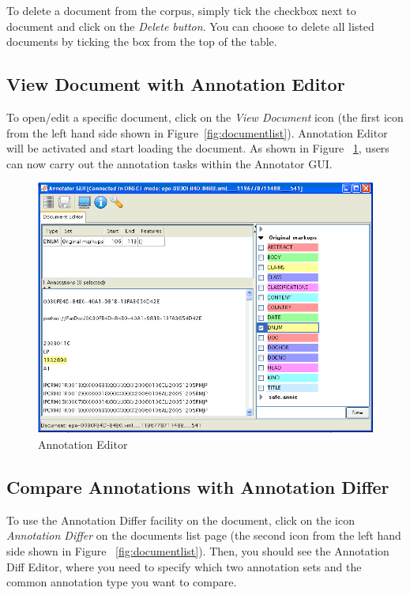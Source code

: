 To delete a document from the corpus, simply tick the checkbox next to document
and click on the
\emph{Delete button}. You can choose to delete all listed documents by ticking
the box from the top of the table.

\subsection{View Document with Annotation Editor}\label{section:annotation-editor}
To open/edit a specific document, click on the \emph{View Document} icon (the
first icon from the left hand side shown in Figure~\ref{fig:documentlist}).
Annotation Editor will be activated and start
loading the document. As shown in Figure ~\ref{fig:annotatorgui}, users can
now carry out the annotation tasks within the Annotator GUI.

\begin{figure}[ht!]
\centering
\includegraphics[scale=0.35]{annotatorgui}
\caption{Annotation Editor}
\label{fig:annotatorgui}
\end{figure}

\subsection{Compare Annotations with Annotation Differ}\label{section:annotation-differ}

To use the Annotation Differ facility on the document, click on the icon
\emph{Annotation Differ} on the documents list page (the second icon from the
left hand side shown in Figure ~\ref{fig:documentlist}). Then, you should see the
Annotation Diff Editor, where you need to specify which two annotation sets
and the common annotation type you want to compare.

